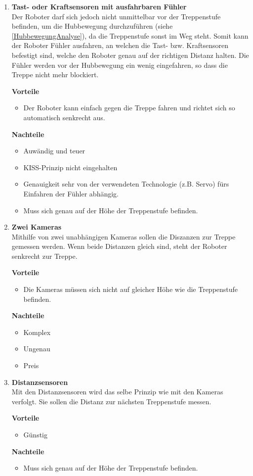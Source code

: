\begin{enumerate}
    \item \textbf{Tast- oder Kraftsensoren mit ausfahrbaren Fühler}\\
    Der Roboter darf sich jedoch nicht unmittelbar vor der Treppenstufe befinden, um die Hubbewegung durchzuführen (siehe \ref{HubbewegungAnalyse}), da die Treppenstufe sonst im Weg steht. Somit kann der Roboter Fühler ausfahren, an welchen die Tast- bzw. Kraftsensoren befestigt sind, welche den Roboter genau auf der richtigen Distanz halten. Die Fühler werden vor der Hubbewegung ein wenig eingefahren, so dass die Treppe nicht mehr blockiert.
    
    \textbf{Vorteile}
    \begin{itemize}
        \item Der Roboter kann einfach gegen die Treppe fahren und richtet sich so automatisch senkrecht aus.
    \end{itemize}
    \textbf{Nachteile}
    \begin{itemize}
        \item Auwändig und teuer
        \item KISS-Prinzip nicht eingehalten
        \item Genauigkeit sehr von der verwendeten Technologie (z.B. Servo) fürs Einfahren der Fühler
        abhängig. 
        \item Muss sich genau auf der Höhe der Treppenstufe befinden.
    \end{itemize}
    
    \item \textbf{Zwei Kameras}\\
    Mithilfe von zwei unabhängigen Kameras sollen die Diszanzen zur Treppe gemessen werden. Wenn beide Distanzen gleich sind, steht der Roboter senkrecht zur Treppe.
    
    \textbf{Vorteile}
    \begin{itemize}
        \item Die Kameras müssen sich nicht auf gleicher Höhe wie die Treppenstufe befinden.
    \end{itemize}
    \textbf{Nachteile}
    \begin{itemize}
        \item Komplex
        \item Ungenau
        \item Preis
    \end{itemize}
    
    \item \textbf{Distanzsensoren}\\
    Mit den Distanzsensoren wird das selbe Prinzip wie mit den Kameras verfolgt. Sie sollen die Distanz zur nächsten Treppenstufe messen.
    
    \textbf{Vorteile}
    \begin{itemize}
        \item Günstig
    \end{itemize}
    \textbf{Nachteile}
    \begin{itemize}
        \item Muss sich genau auf der Höhe der Treppenstufe befinden.
    \end{itemize}
\end{enumerate}
